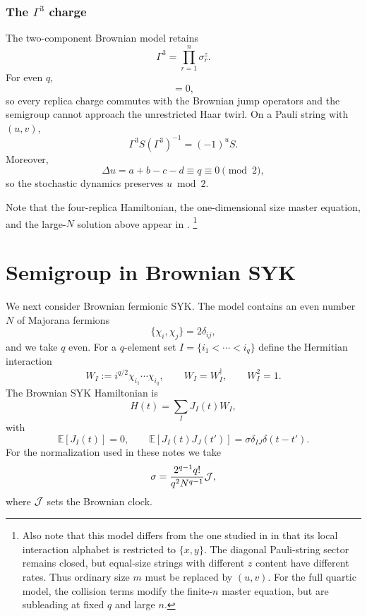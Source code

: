 \documentclass{article}
\theoremstyle{definition}
\begin{document}
\subsubsection{The $\Gamma^3$ charge}

The two-component Brownian model retains
\begin{equation}
    \Gamma^3=\prod_{r=1}^n\sigma_r^z.
\end{equation}
For even $q$,
\begin{equation}
    [\Gamma^3,V_I]=0,
\end{equation}
so every replica charge commutes with the Brownian jump operators and the
semigroup cannot approach the unrestricted Haar twirl.  On a Pauli string
with $(u,v)$,
\begin{equation}
    \Gamma^3S(\Gamma^3)^{-1}=(-1)^uS.
\end{equation}
Moreover,
\begin{equation}
    \Delta u=a+b-c-d\equiv q\equiv0\pmod2,
\end{equation}
so the stochastic dynamics preserves $u\bmod2$.

Note that the four-replica
Hamiltonian, the one-dimensional size master equation, and the large-$N$ solution above appear in \cite{xu2025dynamics}. \footnote{Also note that this model differs from the one studied in \cite{basu2026complexity} in that its local interaction alphabet is restricted to $\{x,y\}$. The diagonal Pauli-string sector remains closed,
but equal-size strings with different $z$ content have different rates.
Thus ordinary size $m$ must be replaced by $(u,v)$.  For the full quartic
model, the collision terms modify the finite-$n$ master equation, but are
subleading at fixed $q$ and large $n$.}




\section{Semigroup in Brownian SYK}
\label{sec:brownian_syk}

We next consider Brownian fermionic SYK.  The model contains an even number
$N$ of Majorana fermions
\begin{equation}
    \{\chi_i,\chi_j\}=2\delta_{ij},
\end{equation}
and we take $q$ even.  For a $q$-element set
$I=\{i_1<\cdots<i_q\}$ define the Hermitian interaction
\begin{equation}
    W_I:=i^{q/2}\chi_{i_1}\cdots\chi_{i_q},
    \qquad
    W_I=W_I^\dagger,
    \qquad
    W_I^2=1.
\end{equation}
The Brownian SYK Hamiltonian is
\begin{equation}
    H(t)=\sum_IJ_I(t)W_I,
\end{equation}
with
\begin{equation}
    \mathbb E[J_I(t)]=0,
    \qquad
    \mathbb E[J_I(t)J_J(t')]
    =\sigma\delta_{IJ}\delta(t-t').
\end{equation}
For the normalization used in these notes we take
\begin{equation}
    \sigma=\frac{2^{q-1}q!}{q^2N^{q-1}}{\cal J},
\end{equation}
where ${\cal J}$ sets the Brownian clock.
\end{document}
